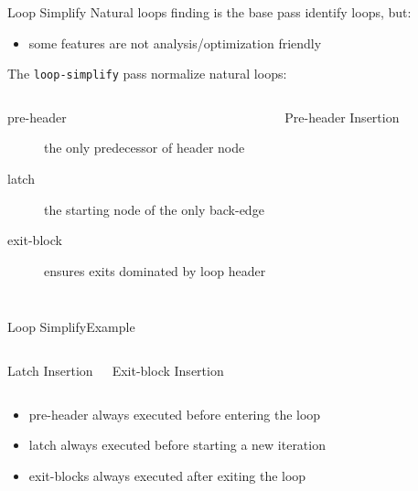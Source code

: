 \begin{frame}{Loop Simplify}
Natural loops finding is the base pass \alert{identify} loops, but:

\begin{itemize}
\item some features are not analysis/optimization friendly
\end{itemize}

\vfill
The \texttt{loop-simplify} pass normalize natural loops:

\begin{columns}[t]
\begin{description}
\item[pre-header] the \alert{only predecessor} of \alert{header} node
\item[latch] the \alert{starting node} of the \alert{only back-edge}
\item[exit-block] ensures \alert{exits dominated} by loop \alert{header}
\end{description}

\begin{block}{Pre-header Insertion}
\centering

\end{block}
\end{columns}
\end{frame}

\begin{frame}{Loop Simplify}{Example}
\begin{columns}[t]
\begin{block}{Latch Insertion}
\centering

\end{block}

\begin{block}{Exit-block Insertion}
\centering

\end{block}
\end{columns}

\begin{itemize}
\item pre-header always executed before entering the loop
\item latch always executed before starting a new iteration
\item exit-blocks always executed after exiting the loop
\end{itemize}
\end{frame}

